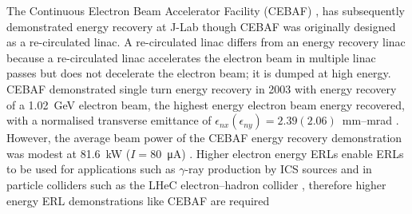 \documentclass[../main.tex]{subfiles}
\begin{document}
The Continuous Electron Beam Accelerator Facility (CEBAF) \cite{bogacz2003cebaf,tennant2003beam}, has subsequently demonstrated energy recovery at J-Lab though CEBAF was originally designed as a re-circulated linac. A re-circulated linac differs from an energy recovery linac because a re-circulated linac accelerates the electron beam in multiple linac passes but does not decelerate the electron beam; it is dumped at high energy. CEBAF demonstrated single turn energy recovery in 2003 \cite{bogacz2003cebaf,tennant2003beam} with energy recovery of a 1.02~\si{\giga\electronvolt} electron beam, the highest energy electron beam energy recovered, with a normalised transverse emittance of $\epsilon_{nx} \left(\epsilon_{ny}\right) = 2.39 \left(2.06\right)$~\si{\milli\meter}--\si{\milli\radian} \cite{tennant2003beam}. However, the average beam power of the CEBAF energy recovery demonstration was modest at 81.6~\si{\kilo\watt} ($I = 80$~\si{\micro\ampere}) \cite{freyberger2004cebaf}. Higher electron energy ERLs enable ERLs to be used for applications such as $\gamma$-ray production by ICS sources\cite{budker2021expanding} and in particle colliders such as the LHeC electron--hadron collider \cite{agostini2021large}, therefore higher energy ERL demonstrations like CEBAF are required   
\end{document}
